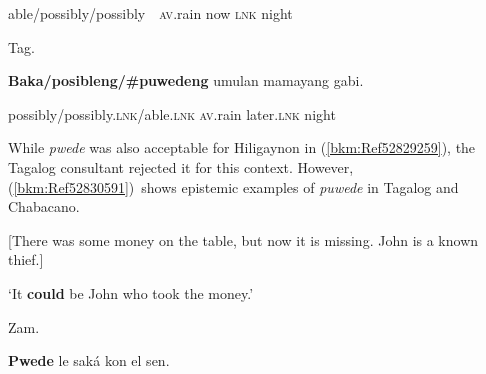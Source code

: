 \begin{stylelsIMT}
able/possibly/possibly\ \  \textsc{av}.rain now \textsc{lnk} night
\end{stylelsIMT}

\begin{listWWNumiileveli}
\item 
\begin{listWWNumiilevelii}
\item 
\begin{stylelsLanginfo}
Tag.
\end{stylelsLanginfo}
\end{listWWNumiilevelii}
\end{listWWNumiileveli}
\begin{stylelsSourceline}
\textbf{Baka/posibleng/\#puwedeng }umulan mamayang gabi.
\end{stylelsSourceline}

\begin{styleStandard}
possibly/possibly.\textsc{lnk}/able.\textsc{lnk} \textsc{av}.rain later.\textsc{lnk} night
\end{styleStandard}

\begin{styleStandard}
While \textit{pwede} was also acceptable for Hiligaynon in (\ref{bkm:Ref52829259}), the Tagalog consultant rejected it for this context. However, (\ref{bkm:Ref52830591})\ shows epistemic examples of \textit{puwede} in Tagalog and Chabacano.
\end{styleStandard}

\begin{listWWNumiileveli}
\item 
\begin{stylelsLanginfo}
\label{bkm:Ref52830591}[There was some money on the table, but now it is missing. John is a known thief.] 
\end{stylelsLanginfo}
\end{listWWNumiileveli}
\begin{stylelsLanginfo}
‘It \textbf{could} be John who took the money.’
\end{stylelsLanginfo}

\begin{listWWNumiileveli}
\item 
\begin{listWWNumiilevelii}
\item 
\begin{stylelsLanginfo}
Zam.
\end{stylelsLanginfo}
\end{listWWNumiilevelii}
\end{listWWNumiileveli}
\begin{stylelsSourceline}
\textbf{Pwede} le saká kon el sen.
\end{stylelsSourceline}

